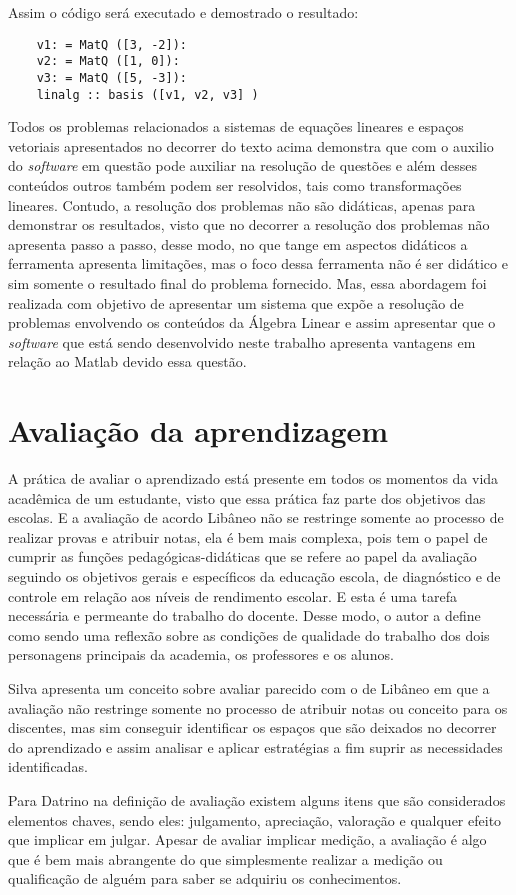 Assim o código será executado e demostrado o resultado: 

\begin{lstlisting}
    v1: = MatQ ([3, -2]): 
    v2: = MatQ ([1, 0]): 
    v3: = MatQ ([5, -3]): 
    linalg :: basis ([v1, v2, v3] )
\end{lstlisting}

Todos os problemas relacionados a sistemas de equações lineares e espaços vetoriais apresentados no decorrer do texto acima demonstra que com o auxilio do \textit{software} em questão pode auxiliar na resolução de questões e além desses conteúdos outros também podem ser resolvidos, tais como transformações lineares. Contudo, a resolução dos problemas não são didáticas, apenas para demonstrar os resultados, visto que no decorrer a resolução dos problemas não apresenta passo a passo, desse modo, no que tange em aspectos didáticos a ferramenta apresenta limitações, mas o foco dessa ferramenta não é ser didático e sim somente o resultado final do problema fornecido. Mas, essa abordagem foi realizada com objetivo de apresentar um sistema que expõe a resolução de problemas envolvendo os conteúdos da Álgebra Linear e assim apresentar que o \textit{software} que está sendo desenvolvido neste trabalho apresenta vantagens em relação ao Matlab devido essa questão.

\section{Avaliação da aprendizagem}
\noindent A prática de avaliar o aprendizado está presente em todos os momentos da vida acadêmica de um estudante, visto que essa prática faz parte dos objetivos das escolas. E a avaliação de acordo Libâneo \cite{1990:libaneo} não se restringe somente ao processo de realizar provas e atribuir notas, ela é bem mais complexa, pois tem o papel de cumprir as funções pedagógicas-didáticas que se refere ao papel da avaliação seguindo os objetivos gerais e específicos da educação escola, de diagnóstico e de controle em relação aos níveis de rendimento escolar. E esta é uma tarefa necessária e permeante do trabalho do docente. Desse modo, o autor a define como sendo uma reflexão sobre as condições de qualidade do trabalho dos dois personagens principais da academia, os professores e os alunos.

Silva \cite{2015:Silva} apresenta um conceito sobre avaliar parecido com o de Libâneo \cite{1990:libaneo} em que a avaliação não restringe somente no processo de atribuir notas ou conceito para os discentes, mas sim conseguir identificar os espaços que são deixados no decorrer do aprendizado e assim analisar e aplicar estratégias a fim suprir as necessidades identificadas.

Para Datrino \cite{2010:Datrino} na definição de avaliação existem alguns itens que são considerados elementos chaves, sendo eles: julgamento, apreciação, valoração e qualquer efeito que implicar em julgar. Apesar de avaliar implicar medição, a avaliação é algo que é bem mais abrangente do que simplesmente realizar a medição ou qualificação de alguém para saber se adquiriu os conhecimentos.
